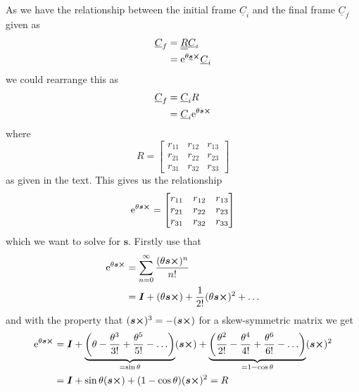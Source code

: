 \documentclass[a4paper]{scrartcl}
\newcommand{\me}[1]{\mathrm{e}^{#1}}
\begin{document}
As we have the relationship between the initial frame $\underline{C}_i$ and the final frame $\underline{C}_f$ given as
\begin{equation}
    \begin{aligned}
        \underline{C}_f &= \underline{\underline{R}}\underline{C}_i\\
        &= \me{\theta \underline{\bm{s}}\cross}\underline{C}_i
    \end{aligned}
\end{equation}
we could rearrange this as
\begin{equation}
    \begin{aligned}
        \underline{C}_f &= \underline{C}_i R\\
         &= \underline{C}_i \me{\theta\bm{s}\cross}
    \end{aligned}
\end{equation}
where
\begin{equation}
    R = \begin{bmatrix}
        r_{11} & r_{12} & r_{13} \\  r_{21} & r_{22} & r_{23} \\  r_{31} & r_{32} & r_{33}
    \end{bmatrix}
\end{equation}
as given in the text. This gives us the relationship
\begin{equation}
    \begin{aligned}
        \me{\theta\bm{s}\cross} = \begin{bmatrix}
        r_{11} & r_{12} & r_{13} \\  r_{21} & r_{22} & r_{23} \\  r_{31} & r_{32} & r_{33}
    \end{bmatrix}
    \end{aligned}
\end{equation}
which we want to solve for $\bm{s}$. Firstly use that
\begin{equation}
    \begin{aligned}
         \me{\theta\bm{s}\cross} &= \sum_{n=0}^{\infty}\frac{(\theta \bm{s}\cross)^n}{n!}\\
         &= \bm{I} + (\theta \bm{s}\cross) + \frac{1}{2!}(\theta \bm{s}\cross)^2 + \hdots
    \end{aligned}
\end{equation}
and with the property that $(\bm{s}\cross)^3 = - (\bm{s}\cross)$ for a skew-symmetric matrix we get
\begin{equation}
    \begin{aligned}
        \me{\theta\bm{s}\cross} &= \bm{I} + \underbrace{\left(\theta - \frac{\theta^3}{3!} + \frac{\theta^5}{5!} - \hdots \right)}_{= \sin\theta}(\bm{s}\cross)
        + \underbrace{\left(\frac{\theta^2}{2!} - \frac{\theta^4}{4!} +\frac{\theta^6}{6!} - \hdots \right)}_{= 1- \cos\theta}(\bm{s}\cross)^2\\
        &= \bm{I} + \sin\theta(\bm{s}\cross) + (1-\cos\theta)(\bm{s}\cross)^2
        = R
    \end{aligned}
\end{equation}
\end{document}

